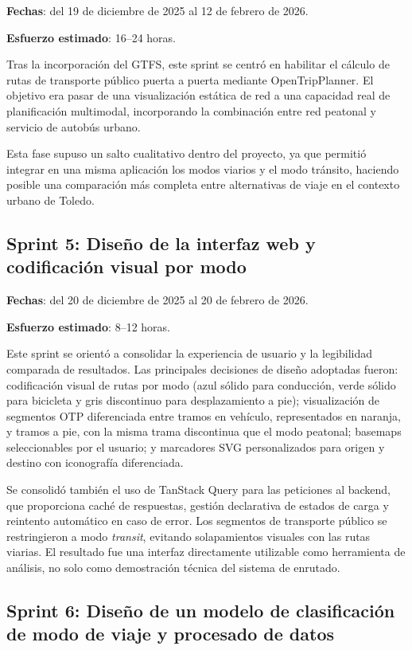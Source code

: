 \textbf{Fechas}: del 19 de diciembre de 2025 al 12 de febrero de 2026.

\textbf{Esfuerzo estimado}: 16--24 horas.

Tras la incorporación del GTFS, este sprint se centró en habilitar el cálculo de rutas de transporte público puerta a puerta mediante OpenTripPlanner. El objetivo era pasar de una visualización estática de red a una capacidad real de planificación multimodal, incorporando la combinación entre red peatonal y servicio de autobús urbano.

Esta fase supuso un salto cualitativo dentro del proyecto, ya que permitió integrar en una misma aplicación los modos viarios y el modo tránsito, haciendo posible una comparación más completa entre alternativas de viaje en el contexto urbano de Toledo.

\subsection{Sprint 5: Diseño de la interfaz web y codificación visual por modo}

\textbf{Fechas}: del 20 de diciembre de 2025 al 20 de febrero de 2026.

\textbf{Esfuerzo estimado}: 8--12 horas.

Este sprint se orientó a consolidar la experiencia de usuario y la legibilidad comparada de resultados. Las principales decisiones de diseño adoptadas fueron: codificación visual de rutas por modo (azul sólido para conducción, verde sólido para bicicleta y gris discontinuo para desplazamiento a pie); visualización de segmentos OTP diferenciada entre tramos en vehículo, representados en naranja, y tramos a pie, con la misma trama discontinua que el modo peatonal; basemaps seleccionables por el usuario; y marcadores SVG personalizados para origen y destino con iconografía diferenciada.

Se consolidó también el uso de TanStack Query para las peticiones al backend, que proporciona caché de respuestas, gestión declarativa de estados de carga y reintento automático en caso de error. Los segmentos de transporte público se restringieron a modo \textit{transit}, evitando solapamientos visuales con las rutas viarias. El resultado fue una interfaz directamente utilizable como herramienta de análisis, no solo como demostración técnica del sistema de enrutado.

\subsection{Sprint 6: Diseño de un modelo de clasificación de modo de viaje y procesado de datos}

